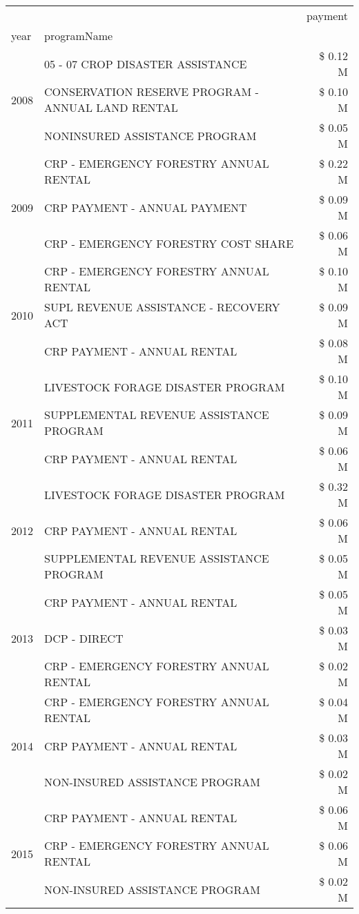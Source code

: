 \begin{tabular}{llr}
\toprule
 &  & payment \\
year & programName &  \\
\midrule
\multirow[t]{3}{*}{2008} & 05 - 07 CROP DISASTER ASSISTANCE & \$ 0.12 M \\
 & CONSERVATION RESERVE PROGRAM - ANNUAL LAND RENTAL & \$ 0.10 M \\
 & NONINSURED ASSISTANCE PROGRAM & \$ 0.05 M \\
\cline{1-3}
\multirow[t]{3}{*}{2009} & CRP - EMERGENCY FORESTRY ANNUAL RENTAL & \$ 0.22 M \\
 & CRP PAYMENT - ANNUAL PAYMENT & \$ 0.09 M \\
 & CRP - EMERGENCY FORESTRY COST SHARE & \$ 0.06 M \\
\cline{1-3}
\multirow[t]{3}{*}{2010} & CRP - EMERGENCY FORESTRY ANNUAL RENTAL & \$ 0.10 M \\
 & SUPL REVENUE ASSISTANCE - RECOVERY ACT & \$ 0.09 M \\
 & CRP PAYMENT - ANNUAL RENTAL & \$ 0.08 M \\
\cline{1-3}
\multirow[t]{3}{*}{2011} & LIVESTOCK FORAGE DISASTER PROGRAM & \$ 0.10 M \\
 & SUPPLEMENTAL REVENUE ASSISTANCE PROGRAM & \$ 0.09 M \\
 & CRP PAYMENT - ANNUAL RENTAL & \$ 0.06 M \\
\cline{1-3}
\multirow[t]{3}{*}{2012} & LIVESTOCK FORAGE DISASTER PROGRAM & \$ 0.32 M \\
 & CRP PAYMENT - ANNUAL RENTAL & \$ 0.06 M \\
 & SUPPLEMENTAL REVENUE ASSISTANCE PROGRAM & \$ 0.05 M \\
\cline{1-3}
\multirow[t]{3}{*}{2013} & CRP PAYMENT - ANNUAL RENTAL & \$ 0.05 M \\
 & DCP - DIRECT & \$ 0.03 M \\
 & CRP - EMERGENCY FORESTRY ANNUAL RENTAL & \$ 0.02 M \\
\cline{1-3}
\multirow[t]{3}{*}{2014} & CRP - EMERGENCY FORESTRY ANNUAL RENTAL & \$ 0.04 M \\
 & CRP PAYMENT - ANNUAL RENTAL & \$ 0.03 M \\
 & NON-INSURED ASSISTANCE PROGRAM & \$ 0.02 M \\
\cline{1-3}
\multirow[t]{3}{*}{2015} & CRP PAYMENT - ANNUAL RENTAL & \$ 0.06 M \\
 & CRP - EMERGENCY FORESTRY ANNUAL RENTAL & \$ 0.06 M \\
 & NON-INSURED ASSISTANCE PROGRAM & \$ 0.02 M \\

\end{tabular}
